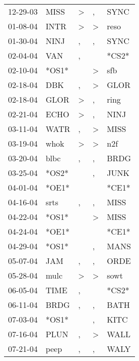 \begin{supertabular}{lllll}
 12-29-03 &   MISS &     \textgreater &                , &   SYNC \\
 01-08-04 &   INTR &     \textgreater &     \textgreater &   reso \\
 01-30-04 &   NINJ &                , &                , &   SYNC \\
 02-04-04 &    VAN &                , &                  &  *CS2* \\
 02-10-04 &  *OS1* &                  &     \textgreater &    sfb \\
 02-18-04 &    DBK &                , &     \textgreater &   GLOR \\
 02-18-04 &   GLOR &     \textgreater &                , &   ring \\
 02-21-04 &   ECHO &     \textgreater &                , &   NINJ \\
 03-11-04 &   WATR &                , &     \textgreater &   MISS \\
 03-19-04 &   whok &     \textgreater &     \textgreater &    n2f \\
 03-20-04 &   blbc &                , &                , &   BRDG \\
 03-25-04 &  *OS2* &                  &                , &   JUNK \\
 04-01-04 &  *OE1* &                  &                  &  *CE1* \\
 04-16-04 &   srts &                , &                , &   MISS \\
 04-22-04 &  *OS1* &                  &     \textgreater &   MISS \\
 04-24-04 &  *OE1* &                  &                  &  *CE1* \\
 04-29-04 &  *OS1* &                  &                , &   MANS \\
 05-07-04 &    JAM &                , &                , &   ORDE \\
 05-28-04 &   mulc &     \textgreater &     \textgreater &   sowt \\
 06-05-04 &   TIME &                , &                  &  *CS2* \\
 06-11-04 &   BRDG &                , &                , &   BATH \\
 07-03-04 &  *OS1* &                  &                , &   KITC \\
 07-16-04 &   PLUN &                , &     \textgreater &   WALL \\
 07-21-04 &   peep &                , &                , &   WALY \\

\end{supertabular}

